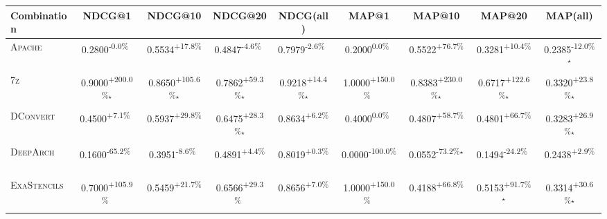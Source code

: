 \begin{table}[htbp]
\centering
\renewcommand{\arraystretch}{1.2}
\begin{tabular}{l|cccc|cccc}
\hline
Combination & NDCG@1 & NDCG@10 & NDCG@20 & NDCG(all) & MAP@1 & MAP@10 & MAP@20 & MAP(all) \\ \hline
\textsc{Apache} & \cellcolor{red!30}0.2800\textsuperscript{-0.0\%}$^{\,\,\,}$ & \cellcolor{green!30}0.5534\textsuperscript{+17.8\%}$^{\,\,\,}$ & \cellcolor{red!30}0.4847\textsuperscript{-4.6\%}$^{\,\,\,}$ & \cellcolor{red!30}0.7979\textsuperscript{-2.6\%}$^{\,\,\,}$ & \cellcolor{red!30}0.2000\textsuperscript{0.0\%}$^{\,\,\,}$ & \cellcolor{green!30}0.5522\textsuperscript{+76.7\%}$^{\,\,\,}$ & \cellcolor{green!30}0.3281\textsuperscript{+10.4\%}$^{\,\,\,}$ & \cellcolor{red!30}0.2385\textsuperscript{-12.0\%}$^\star$ \\
\textsc{7z} & \cellcolor{green!30}0.9000\textsuperscript{+200.0\%}$^\star$ & \cellcolor{green!30}0.8650\textsuperscript{+105.6\%}$^\star$ & \cellcolor{green!30}0.7862\textsuperscript{+59.3\%}$^\star$ & \cellcolor{green!30}0.9218\textsuperscript{+14.4\%}$^\star$ & \cellcolor{green!30}1.0000\textsuperscript{+150.0\%}$^{\,\,\,}$ & \cellcolor{green!30}0.8383\textsuperscript{+230.0\%}$^\star$ & \cellcolor{green!30}0.6717\textsuperscript{+122.6\%}$^\star$ & \cellcolor{green!30}0.3320\textsuperscript{+23.8\%}$^\star$ \\
\textsc{DConvert} & \cellcolor{green!30}0.4500\textsuperscript{+7.1\%}$^{\,\,\,}$ & \cellcolor{green!30}0.5937\textsuperscript{+29.8\%}$^{\,\,\,}$ & \cellcolor{green!30}0.6475\textsuperscript{+28.3\%}$^\star$ & \cellcolor{green!30}0.8634\textsuperscript{+6.2\%}$^{\,\,\,}$ & \cellcolor{red!30}0.4000\textsuperscript{0.0\%}$^{\,\,\,}$ & \cellcolor{green!30}0.4807\textsuperscript{+58.7\%}$^{\,\,\,}$ & \cellcolor{green!30}0.4801\textsuperscript{+66.7\%}$^{\,\,\,}$ & \cellcolor{green!30}0.3283\textsuperscript{+26.9\%}$^\star$ \\
\textsc{DeepArch} & \cellcolor{red!30}0.1600\textsuperscript{-65.2\%}$^{\,\,\,}$ & \cellcolor{red!30}0.3951\textsuperscript{-8.6\%}$^{\,\,\,}$ & \cellcolor{green!30}0.4891\textsuperscript{+4.4\%}$^{\,\,\,}$ & \cellcolor{green!30}0.8019\textsuperscript{+0.3\%}$^{\,\,\,}$ & \cellcolor{red!30}0.0000\textsuperscript{-100.0\%}$^{\,\,\,}$ & \cellcolor{red!30}0.0552\textsuperscript{-73.2\%}$^\star$ & \cellcolor{red!30}0.1494\textsuperscript{-24.2\%}$^{\,\,\,}$ & \cellcolor{green!30}0.2438\textsuperscript{+2.9\%}$^{\,\,\,}$ \\
\textsc{ExaStencils} & \cellcolor{green!30}0.7000\textsuperscript{+105.9\%}$^{\,\,\,}$ & \cellcolor{green!30}0.5459\textsuperscript{+21.7\%}$^{\,\,\,}$ & \cellcolor{green!30}0.6566\textsuperscript{+29.3\%}$^{\,\,\,}$ & \cellcolor{green!30}0.8656\textsuperscript{+7.0\%}$^{\,\,\,}$ & \cellcolor{green!30}1.0000\textsuperscript{+150.0\%}$^{\,\,\,}$ & \cellcolor{green!30}0.4188\textsuperscript{+66.8\%}$^{\,\,\,}$ & \cellcolor{green!30}0.5153\textsuperscript{+91.7\%}$^\star$ & \cellcolor{green!30}0.3314\textsuperscript{+30.6\%}$^\star$ \\

\end{tabular}
\end{table}
